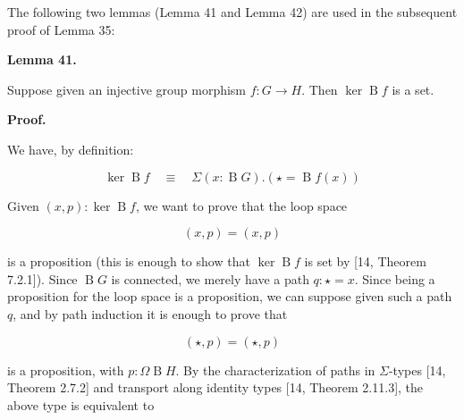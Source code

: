 
 
The following two lemmas (Lemma 41 and Lemma 42) are used in the subsequent proof of Lemma 35:\par
 
 
 
\par\medskip\noindent\textbf{Lemma 41.}\par
 
 
Suppose given an injective group morphism $f:G\to H$. Then $\ker\operatorname{B}f$ is a set.\par
 
 
 
 
 
\par\medskip\noindent\textbf{Proof.}\par
 
 
We have, by definition:\par
  
\par  \quad  \[\ker\operatorname{B}f\quad\equiv\quad\Sigma(x:\operatorname{B}G).(\star=\operatorname{B}f(x))\]\quad  \quad  
  
Given $(x,p):\ker\operatorname{B}f$, we want to prove that the loop space\par
  
\par  \quad  \[(x,p)=(x,p)\]\quad  \quad  
  
is a proposition (this is enough to show that $\ker\operatorname{B}f$ is set by [14, Theorem 7.2.1]). Since $\operatorname{B}G$ is connected, we merely have a path $q:\star=x$. Since being a proposition for the loop space is a proposition, we can suppose given such a path $q$, and by path induction it is enough to prove that\par
  
\par  \quad  \[(\star,p)=(\star,p)\]\quad  \quad  
  
is a proposition, with $p:\Omega\operatorname{B}H$. By the characterization of paths in $\Sigma$-types [14, Theorem 2.7.2] and transport along identity types [14, Theorem 2.11.3], the above type is equivalent to\par
  
